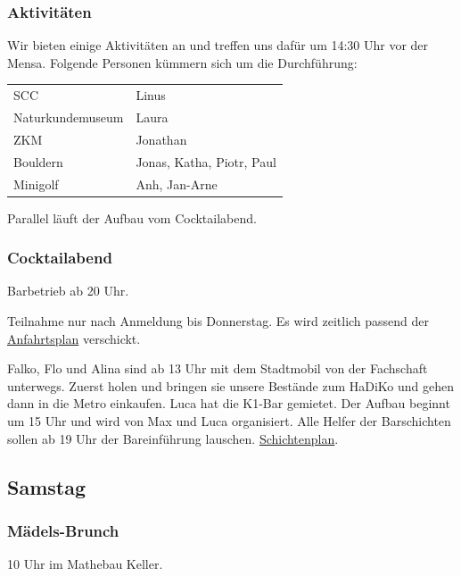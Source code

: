 \documentclass[10pt,ngerman]{scrartcl}
\begin{document}
\begin{multicols}{2}
\subsubsection{Aktivitäten}

Wir bieten einige Aktivitäten an und treffen uns dafür um 14:30 Uhr vor der Mensa.
Folgende Personen kümmern sich um die Durchführung:

\begin{tabular}[H]{ll}
    SCC & Linus \\
    Naturkundemuseum & Laura \\
    ZKM & Jonathan \\
    Bouldern & Jonas, Katha, Piotr, Paul \\
    Minigolf & Anh, Jan-Arne \\
\end{tabular}

Parallel läuft der Aufbau vom Cocktailabend.

\subsubsection{Cocktailabend}

Barbetrieb ab 20 Uhr.

Teilnahme nur nach Anmeldung bis Donnerstag.
Es wird zeitlich passend der \href{https://discord.com/channels/739522765677133894/963505261388107846/1030438323086438440}{Anfahrtsplan} verschickt.

Falko, Flo und Alina sind ab 13 Uhr mit dem Stadtmobil von der Fachschaft unterwegs.
Zuerst holen und bringen sie unsere Bestände zum HaDiKo und gehen dann in die Metro einkaufen.
Luca hat die K1-Bar gemietet.
Der Aufbau beginnt um 15 Uhr und wird von Max und Luca organisiert.
Alle Helfer der Barschichten sollen ab 19 Uhr der Bareinführung lauschen.
\href{https://docs.google.com/spreadsheets/d/17ycbRMmSfck2oAsiZ9djPUULAgf4-vCJ6Q4EXgZmB0g/edit?usp=sharing}{Schichtenplan}.



\subsection{Samstag}

\subsubsection{Mädels-Brunch}

10 Uhr im Mathebau Keller.


\end{multicols}
\end{document}
